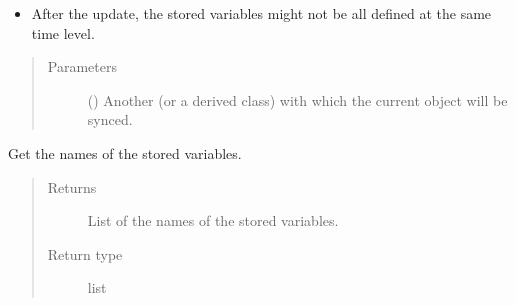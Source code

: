 \documentclass[letterpaper,10pt,english]{sphinxmanual}
\begin{document}
\begin{fulllineitems}
\begin{fulllineitems}
\begin{itemize}
\item {} 
After the update, the stored variables might not be all defined at the same time level.

\end{itemize}
\begin{quote}\begin{description}
\item[{Parameters}] \leavevmode
{} () \textendash{} Another {\hyperref[\detokenize{api:storages.grid_data.GridData}]{}} (or a derived class) with which the current object will be synced.

\end{description}\end{quote}

\end{fulllineitems}


\begin{fulllineitems}
\label{\detokenize{api:storages.grid_data.GridData.variable_names}}
Get the names of the stored variables.
\begin{quote}\begin{description}
\item[{Returns}] \leavevmode
List of the names of the stored variables.

\item[{Return type}] \leavevmode
list

\end{description}\end{quote}

\end{fulllineitems}


\end{fulllineitems}

\end{document}
